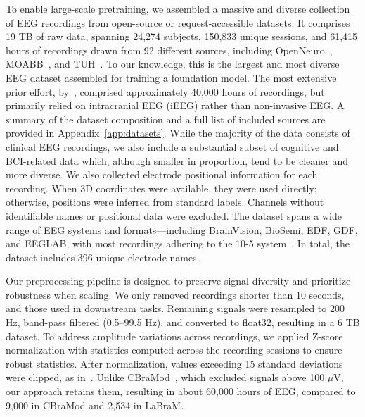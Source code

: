 \documentclass{article}
\begin{document}

To enable large-scale pretraining, we assembled a massive and diverse collection of EEG recordings from open-source or request-accessible datasets. It comprises 19 TB of raw data, spanning 24,274 subjects, 150,833 unique sessions, and 61,415 hours of recordings drawn from 92 different sources, including OpenNeuro~\citep{markiewicz2021openneuro}, MOABB~\citep{Aristimunha_Mother_of_all_2023}, and TUH~\citep{obeid2016temple}. To our knowledge, this is the largest and most diverse EEG dataset assembled for training a foundation model. The most extensive prior effort, by~\citet{yuan2024brainwavebrainsignalfoundation}, comprised approximately 40,000 hours of recordings, but primarily relied on intracranial EEG (iEEG) rather than non-invasive EEG. A summary of the dataset composition and a full list of included sources are provided in Appendix~\ref{app:datasets}. While the majority of the data consists of clinical EEG recordings, we also include a substantial subset of cognitive and BCI-related data which, although smaller in proportion, tend to be cleaner and more diverse.
We also collected electrode positional information for each recording. When 3D coordinates were available, they were used directly; otherwise, positions were inferred from standard labels. Channels without identifiable names or positional data were excluded. The dataset spans a wide range of EEG systems and formats—including BrainVision, BioSemi, EDF, GDF, and EEGLAB, with most recordings adhering to the 10-5 system~\citep{oostenveld2001five}. In total, the dataset includes 396 unique electrode names.

Our preprocessing pipeline is designed to preserve signal diversity and prioritize robustness when scaling. We only removed recordings shorter than 10 seconds, and those used in downstream tasks. Remaining signals were resampled to 200 Hz, band-pass filtered (0.5–99.5 Hz), and converted to float32, resulting in a 6 TB dataset. To address amplitude variations across recordings, we applied Z-score normalization with statistics computed across the recording sessions to ensure robust statistics. After normalization, values exceeding 15 standard deviations were clipped, as in~\citet{defossez2023decoding}. Unlike CBraMod~\citep{wang2024cbramod}, which excluded signals above 100 $\mu\text{V}$, our approach retains them, resulting in about 60,000 hours of EEG, compared to 9,000 in CBraMod and 2,534 in LaBraM.
\end{document}
